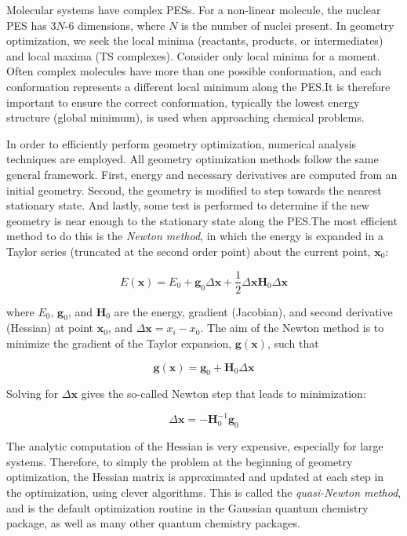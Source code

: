 Molecular systems have complex PESs. For a non-linear molecule, the nuclear PES
has 3$N$-6 dimensions, where $N$ is the number of nuclei
present.\cite{Heidrich1991} In geometry optimization, we seek the local minima
(reactants, products, or intermediates) and local maxima (TS complexes).
Consider only local minima for a moment. Often complex molecules have more than
one possible conformation, and each conformation represents a different local
minimum along the PES.\@ It is therefore important to ensure the correct
conformation, typically the lowest energy structure (global minimum), is used
when approaching chemical problems.

In order to efficiently perform geometry optimization, numerical analysis
techniques are employed. All geometry optimization methods follow the same
general framework.\cite{Hratchian2005} First, energy and necessary derivatives
are computed from an initial geometry. Second, the geometry is modified to step
towards the nearest stationary state. And lastly, some test is performed to
determine if the new geometry is near enough to the stationary state along the
PES.\@ The most efficient method to do this is the \emph{Newton method}, in
which the energy is expanded in a Taylor series (truncated at the second order
point) about the current point, $\mathbf{x}_0$:

\begin{equation}
  E(\mathbf{x}) = E_0 + \mathbf{g}_0\Delta\mathbf{x} + \frac{1}{2}\Delta\mathbf{x}\mathbf{H}_0\Delta \mathbf{x}
\end{equation}

\noindent where $E_0$, $\mathbf{g}_0$, and $\mathbf{H}_0$ are the energy,
gradient (Jacobian), and second derivative (Hessian) at point $\mathbf{x}_0$,
and $\Delta \mathbf{x} = x_i - x_0$. The aim of the Newton method is to
minimize the gradient of the Taylor expansion, $\mathbf{g(x)}$, such that

\begin{equation}
  \mathbf{g(x)} = \mathbf{g}_0 + \mathbf{H}_0 \Delta \mathbf{x}
\end{equation}

\noindent Solving for $\Delta \mathbf{x}$ gives the so-called Newton step that
leads to minimization:

\begin{equation}
  \Delta \mathbf{x} = -\mathbf{H}^{-1}_0\mathbf{g}_0
\end{equation}

The analytic computation of the Hessian is very expensive, especially for large
systems. Therefore, to simply the problem at the beginning of geometry
optimization, the Hessian matrix is approximated and updated at each step in
the optimization, using clever algorithms.\cite{Hratchian2005} This is called
the \emph{quasi-Newton method}, and is the default optimization routine in the
Gaussian\cite{Frisch2009} quantum chemistry package, as well as many other
quantum chemistry packages.

